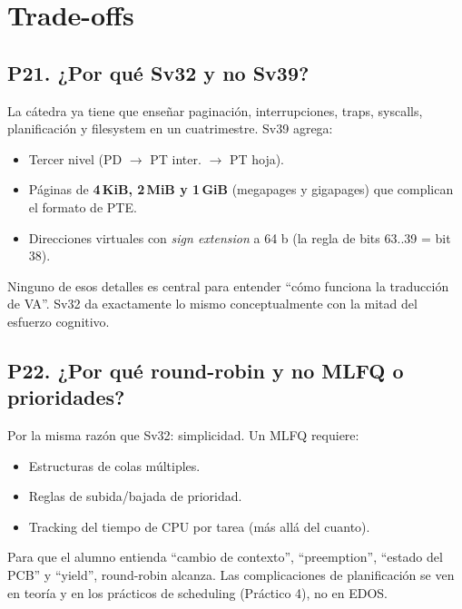 \documentclass[11pt,a4paper]{article}
\begin{document}
\section{Trade-offs}

\subsection*{P21. ¿Por qué Sv32 y no Sv39?}

\begin{respuesta}
La cátedra ya tiene que enseñar paginación, interrupciones, traps,
syscalls, planificación y filesystem en un cuatrimestre. Sv39
agrega:

\begin{itemize}[nosep,leftmargin=*]
    \item Tercer nivel (PD $\to$ PT inter. $\to$ PT hoja).
    \item Páginas de \textbf{4\,KiB, 2\,MiB y 1\,GiB} (megapages
        y gigapages) que complican el formato de PTE.
    \item Direcciones virtuales con \emph{sign extension} a 64 b
        (la regla de bits 63..39 = bit 38).
\end{itemize}

Ninguno de esos detalles es central para entender ``cómo funciona
la traducción de VA''. Sv32 da exactamente lo mismo
conceptualmente con la mitad del esfuerzo cognitivo.
\end{respuesta}

\subsection*{P22. ¿Por qué round-robin y no MLFQ o prioridades?}

\begin{respuesta}
Por la misma razón que Sv32: simplicidad. Un MLFQ requiere:

\begin{itemize}[nosep,leftmargin=*]
    \item Estructuras de colas múltiples.
    \item Reglas de subida/bajada de prioridad.
    \item Tracking del tiempo de CPU por tarea (más allá del cuanto).
\end{itemize}

Para que el alumno entienda ``cambio de contexto'',
``preemption'', ``estado del PCB'' y ``yield'', round-robin
alcanza. Las complicaciones de planificación se ven en teoría y
en los prácticos de scheduling (Práctico 4), no en EDOS.
\end{respuesta}
\end{document}
